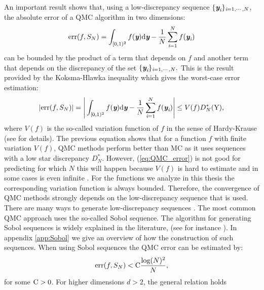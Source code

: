 An important result shows that, using a low-discrepancy sequence $\{\textit{\textbf{y}}_{\textit{i}}\}_{\textit{i}=1, \cdots, N}$, the absolute error of a QMC algorithm in two dimensions:
\begin{equation}
\textrm{err}(f, S_{N}) =\int_{[0,1)^2}f(\textit{\textbf{y}}) \textrm{d}\textit{\textbf{y}}-\frac{1}{N}\sum_{\textit{i}=1}^{N}f(\textit{\textbf{y}}_{\textit{i}})
\end{equation}
 can be bounded by the product of a term that depends on $f$ and another term that depends on the discrepancy of the set $\{\textit{\textbf{y}}_{\textit{i}}\}_{\textit{i}=1, \cdots, N}.$ This is the result provided by the Koksma-Hlawka inequality which gives the worst-case error estimation:
\begin{equation}\label{eq:QMC_error}
|\textrm{err}(f, S_{N})|= \Bigg|\int_{[0,1)^2}f(\textit{\textbf{y}}) \textrm{d}\textit{\textbf{y}}-\frac{1}{N}\sum_{\textit{i}=1}^{N}f(\textit{\textbf{y}}_{\textit{i}})\Bigg|\leq V(f)D^*_N(\mbox{$\textup{Y}$}),
\end{equation}
where $V(f)$ is the so-called variation function of $f$ in the sense of Hardy-Krause (see \cite{brandolini2013koksma} for details). 
The previous equation shows that for a function $f$ with finite variation $V(f)$, QMC methods perform better than MC as it uses sequences with a low star discrepancy $D^*_N$. However, (\ref{eq:QMC_error}) is not good for predicting for which $N$ this will happen because $V(f)$ is hard to estimate and in some cases is even infinite \cite{wang2008low}. 
For the functions we analyze in this thesis the corresponding variation function is always bounded. 
Therefore, the convergence of QMC methods strongly depends on the low-discrepancy sequence that is used.\\ \indent
There are many ways to generate low-discrepancy sequences \cite{dalal2008low}. The most common QMC approach uses the so-called Sobol sequence. The algorithm for generating Sobol sequences is widely explained in the literature, (see for instance \cite{bratley1988algorithm}). In appendix \ref{app:Sobol} we give an overview of how the construction of such sequences. When using Sobol sequences the QMC error can be estimated by:
\begin{equation}
\textrm{err}(f, S_{N})<\textrm{C} \frac{\log(N)^2}{N}, 
\end{equation}
for some $\textrm{C}>0$.
For higher dimensions $d>2$, the general relation holds
